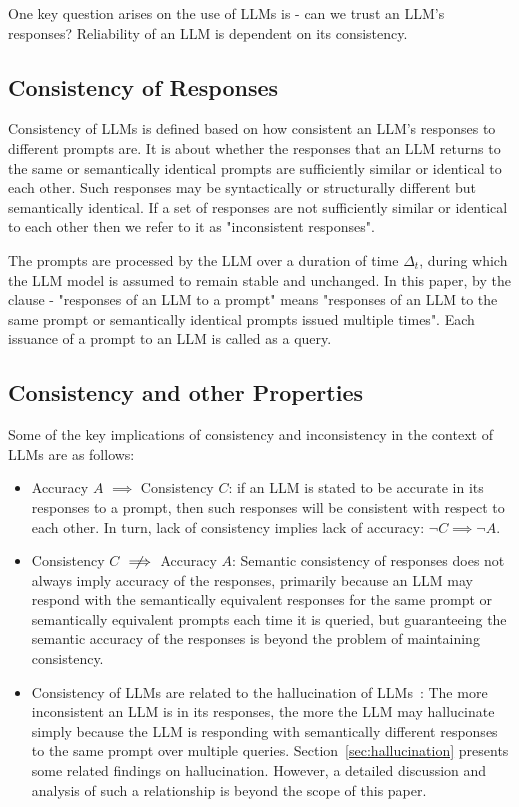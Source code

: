 One key question arises on the use of LLMs is - can we trust an LLM's responses? Reliability of an LLM is dependent on its consistency. 

\subsection{Consistency of Responses}
Consistency of LLMs is defined based on how consistent an LLM's responses to different prompts are. It is about whether the responses that an LLM returns to the same or semantically identical prompts are sufficiently similar or identical to each other. Such responses may be syntactically or structurally different but semantically identical. If a set of responses are not sufficiently similar or identical to each other then we refer to it as "inconsistent responses".   

The prompts are processed by the LLM over a duration of time $\Delta_t$, during which the LLM model is assumed to remain stable and unchanged. In this paper, by the clause - "responses of an LLM to a prompt" means "responses of an LLM to the same prompt or semantically identical prompts issued multiple times". Each issuance of a prompt to an LLM is called as a query.

\subsection{Consistency and other Properties}
Some of the key implications of consistency and inconsistency in the context of LLMs are as follows:
\begin{itemize}    
    \item Accuracy $A$ $\implies$ Consistency $C$: if an LLM is stated to  be accurate in its responses to a prompt, then such responses will be consistent with respect to each other. In turn, lack of consistency implies lack of accuracy: $\neg C \implies \neg A$. 
    \item Consistency $C$ $\centernot\implies$ Accuracy $A$: Semantic consistency of responses does not always imply accuracy of the responses, primarily because an LLM may respond with the semantically equivalent responses for the same prompt or semantically equivalent prompts each time it is queried, but guaranteeing the semantic accuracy of the responses is beyond the problem of maintaining consistency.
    \item Consistency of LLMs are related to the hallucination of LLMs~\cite{mcdonald2024reducing}: The more inconsistent an LLM is in its responses, the more the LLM may hallucinate simply because the LLM is responding with semantically different responses to the same prompt over multiple queries. Section~\ref{sec:hallucination} presents some related findings on hallucination. However, a detailed discussion and analysis of such a relationship is beyond the scope of this paper.
\end{itemize}

